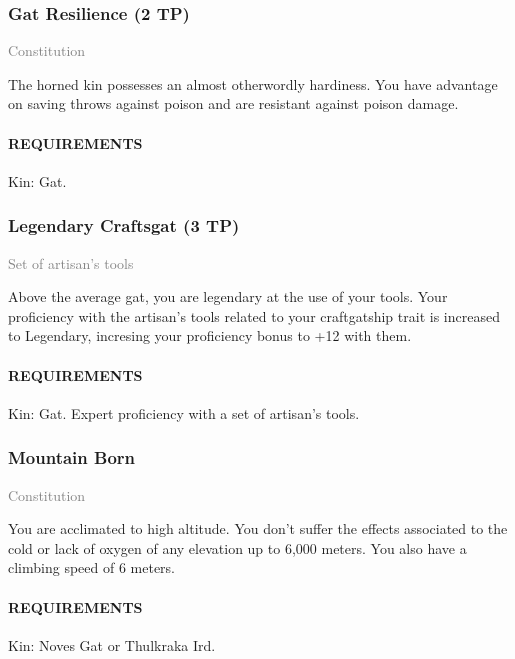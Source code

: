         \subsubsection{Gat Resilience (2 TP)} \label{feat::gatresilience}
        \small{\textcolor{gray}{Constitution}}

        \normalsize
        The horned kin possesses an almost otherwordly hardiness.
        You have advantage on saving throws against poison and are resistant against poison damage.
        \paragraph{REQUIREMENTS} Kin: Gat.

        \subsubsection{Legendary Craftsgat (3 TP)} \label{feat::legendarycraftsgat}
        \small{\textcolor{gray}{Set of artisan's tools}}

        \normalsize
        Above the average gat, you are legendary at the use of your tools.
        Your proficiency with the artisan's tools related to your craftgatship trait is increased to Legendary, incresing your proficiency bonus to +12 with them.
        \paragraph{REQUIREMENTS} Kin: Gat. Expert proficiency with a set of artisan's tools.

        \subsubsection{Mountain Born} \label{feat::mountainborn}
        \small{\textcolor{gray}{Constitution}}

        \normalsize
        You are acclimated to high altitude.
        You don't suffer the effects associated to the cold or lack of oxygen of any elevation up to 6,000 meters.
        You also have a climbing speed of 6 meters.
        \paragraph{REQUIREMENTS} Kin: Noves Gat or Thulkraka Ird.


